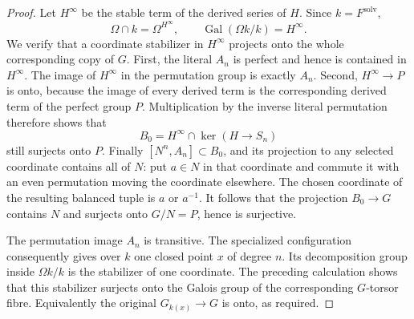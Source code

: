 \begin{proof}
Let $H^\infty$ be the stable term of the derived series of $H$.
Since $k=F^{\mathrm{solv}}$,
\[
 \Omega\cap k=\Omega^{H^\infty},\qquad
 \operatorname{Gal}(\Omega k/k)=H^\infty.
\]
We verify that a coordinate stabilizer in $H^\infty$ projects
onto the whole corresponding copy of $G$. First, the literal
$A_n$ is perfect and hence is contained in $H^\infty$. The image
of $H^\infty$ in the permutation group is exactly $A_n$.
Second, $H^\infty\to P$ is onto, because the image of every
derived term is the corresponding derived term of the perfect
group $P$. Multiplication by the inverse literal permutation
therefore shows that
\[
 B_0=H^\infty\cap\ker(H\to S_n)
\]
still surjects onto $P$. Finally $[N^n,A_n]\subset B_0$, and
its projection to any selected coordinate contains all of $N$:
put $a\in N$ in that coordinate and commute it with an even
permutation moving the coordinate elsewhere. The chosen
coordinate of the resulting balanced tuple is $a$ or $a^{-1}$.
It follows that the projection $B_0\to G$ contains $N$ and
surjects onto $G/N=P$, hence is surjective.

The permutation image $A_n$ is transitive. The specialized
configuration consequently gives over $k$ one closed point $x$
of degree $n$. Its decomposition group inside $\Omega k/k$ is
the stabilizer of one coordinate. The preceding calculation
shows that this stabilizer surjects onto the Galois group of the
corresponding $G$-torsor fibre. Equivalently the original
$G_{k(x)}\to G$ is onto, as required.
\end{proof}

